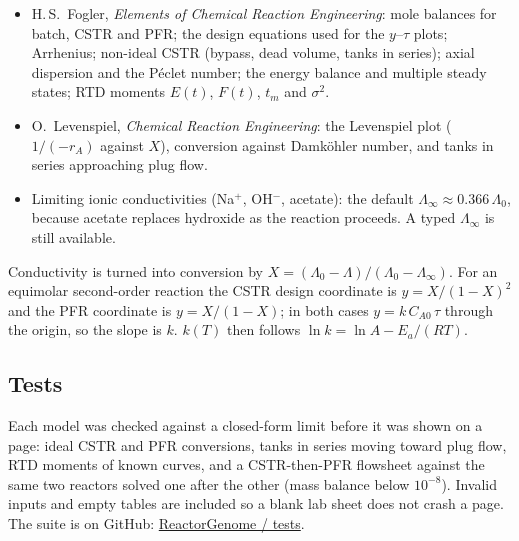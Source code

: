 \documentclass[11pt,a4paper]{article}
\begin{document}
\begin{itemize}
  \item H.\,S.\ Fogler, \emph{Elements of Chemical Reaction Engineering}: mole balances for batch, CSTR and PFR; the
  design equations used for the \(y\)--\(\tau\) plots; Arrhenius; non-ideal CSTR (bypass, dead volume, tanks in series);
  axial dispersion and the Péclet number; the energy balance and multiple steady states; RTD moments \(E(t)\), \(F(t)\),
  \(t_m\) and \(\sigma^2\).
  \item O.\ Levenspiel, \emph{Chemical Reaction Engineering}: the Levenspiel plot (\(1/(-r_A)\) against \(X\)), conversion
  against Damköhler number, and tanks in series approaching plug flow.
  \item Limiting ionic conductivities (Na\(^+\), OH\(^-\), acetate): the default \(\Lambda_\infty \approx 0.366\,\Lambda_0\),
  because acetate replaces hydroxide as the reaction proceeds. A typed \(\Lambda_\infty\) is still available.
\end{itemize}

Conductivity is turned into conversion by
\(X = (\Lambda_0 - \Lambda)/(\Lambda_0 - \Lambda_\infty)\).
For an equimolar second-order reaction the CSTR design coordinate is \(y = X/(1-X)^2\) and the PFR coordinate is
\(y = X/(1-X)\); in both cases \(y = k\,C_{A0}\,\tau\) through the origin, so the slope is \(k\).
\(k(T)\) then follows \(\ln k = \ln A - E_a/(RT)\).

\subsection{Tests}

Each model was checked against a closed-form limit before it was shown on a page: ideal CSTR and PFR conversions,
tanks in series moving toward plug flow, RTD moments of known curves, and a CSTR-then-PFR flowsheet against the same
two reactors solved one after the other (mass balance below \(10^{-8}\)). Invalid inputs and empty tables are included
so a blank lab sheet does not crash a page. The suite is on GitHub:
\href{https://github.com/Mayurdp2403/ReactorGenome/tree/main/tests}{ReactorGenome / tests}.
\end{document}
